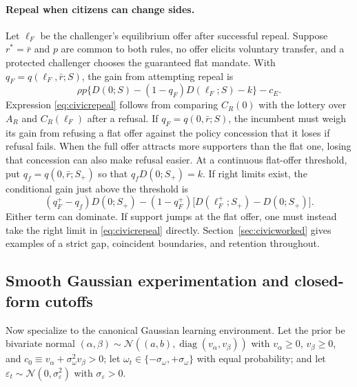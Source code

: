 \documentclass[11pt,letterpaper]{article}
\begin{document}
\paragraph{Repeal when citizens can change sides.}
Let $\ell_F$ be the challenger's equilibrium offer after successful repeal. Suppose $r^*=\bar r$ and $p$ are common to both rules, no offer elicits voluntary transfer, and a protected challenger chooses the guaranteed flat mandate. With $q_F=q(\ell_F,\bar r;S)$, the gain from attempting repeal is
\begin{equation}
 \rho p\{D(0;S)-(1-q_F)D(\ell_F;S)-k\}-c_E .
 \label{eq:civicrepeal}
\end{equation}
Expression \eqref{eq:civicrepeal} follows from comparing $C_R(0)$ with the lottery over $A_R$ and $C_R(\ell_F)$ after a refusal. If $q_F=q(0,\bar r;S)$, the incumbent must weigh its gain from refusing a flat offer against the policy concession that it loses if refusal fails. When the full offer attracts more supporters than the flat one, losing that concession can also make refusal easier. At a continuous flat-offer threshold, put $q_f=q(0,\bar r;S_+)$ so that $q_fD(0;S_+)=k$. If right limits exist, the conditional gain just above the threshold is
\[
 (q_F^+-q_f)D(0;S_+)
 -(1-q_F^+)\big[D(\ell_F^+;S_+)-D(0;S_+)\big].
\]
Either term can dominate. If support jumps at the flat offer, one must instead take the right limit in \eqref{eq:civicrepeal} directly. Section~\ref{sec:civicworked} gives examples of a strict gap, coincident boundaries, and retention throughout.

\subsection{Smooth Gaussian experimentation and closed-form cutoffs}\label{sec:family}

Now specialize to the canonical Gaussian learning environment. Let the prior be bivariate normal $(\alpha,\beta)\sim\mathcal N((a,b),\operatorname{diag}(v_\alpha,v_\beta))$ with $v_\alpha\ge 0$, $v_\beta\ge 0$, and $c_0\equiv v_\alpha+\sigma_\omega^2 v_\beta>0$; let $\omega_t\in\{-\sigma_\omega,+\sigma_\omega\}$ with equal probability; and let $\varepsilon_t\sim\mathcal N(0,\sigma_\varepsilon^2)$ with $\sigma_\varepsilon>0$.
\end{document}
